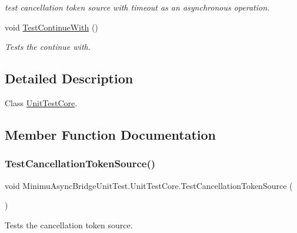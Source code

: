 \begin{DoxyCompactItemize}
\begin{DoxyCompactList}\small\item\em test cancellation token source with timeout as an asynchronous operation. \end{DoxyCompactList}\item 
void \hyperlink{class_minimu_async_bridge_unit_test_1_1_unit_test_core_a3cb73ac5ded3505901b1b9f4ae801b6b}{Test\+Continue\+With} ()
\begin{DoxyCompactList}\small\item\em Tests the continue with. \end{DoxyCompactList}\end{DoxyCompactItemize}


\subsection{Detailed Description}
Class \hyperlink{class_minimu_async_bridge_unit_test_1_1_unit_test_core}{Unit\+Test\+Core}. 



\subsection{Member Function Documentation}
\mbox{\label{class_minimu_async_bridge_unit_test_1_1_unit_test_core_a350471a3a6646906121c7fffde204e09}} 
\subsubsection{\texorpdfstring{Test\+Cancellation\+Token\+Source()}{TestCancellationTokenSource()}}
{\footnotesize\ttfamily void Minimu\+Async\+Bridge\+Unit\+Test.\+Unit\+Test\+Core.\+Test\+Cancellation\+Token\+Source (\begin{DoxyParamCaption}{ }\end{DoxyParamCaption})\hspace{0.3cm}{\ttfamily [inline]}}



Tests the cancellation token source. 

